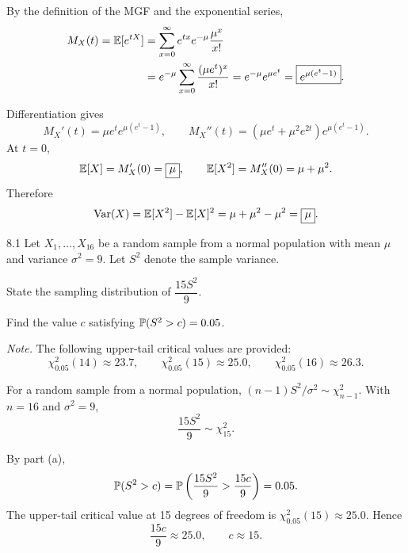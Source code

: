 \documentclass[11pt,oneside]{article}
\begin{document}
\begin{solution}
\begin{problemsubparts}
\item By the definition of the MGF and the exponential series,
\[
\begin{aligned}
M_X(t)=\mathbb{E}[e^{tX}]
&=\sum_{x=0}^{\infty}e^{tx}e^{-\mu}\frac{\mu^x}{x!}\\
&=e^{-\mu}\sum_{x=0}^{\infty}\frac{(\mu e^t)^x}{x!}
=e^{-\mu}e^{\mu e^t}
=\boxed{e^{\mu(e^t-1)}}.
\end{aligned}
\]
\item Differentiation gives
\[
M_X'(t)=\mu e^t e^{\mu(e^t-1)},\qquad
M_X''(t)=(\mu e^t+\mu^2e^{2t})e^{\mu(e^t-1)}.
\]
At $t=0$,
\[
\mathbb{E}[X]=M_X'(0)=\boxed{\mu},\qquad
\mathbb{E}[X^2]=M_X''(0)=\mu+\mu^2.
\]
Therefore
\[
\operatorname{Var}(X)=\mathbb{E}[X^2]-\mathbb{E}[X]^2
=\mu+\mu^2-\mu^2=\boxed{\mu}.
\]
\end{problemsubparts}
\end{solution}

\begin{problem}{8.1}
Let $X_1,\ldots,X_{16}$ be a random sample from a normal population with mean $\mu$ and variance $\sigma^2=9$. Let $S^2$ denote the sample variance.
\begin{problemsubparts}
\item State the sampling distribution of $\dfrac{15S^2}{9}$.
\item Find the value $c$ satisfying $\mathbb{P}(S^2>c)=0.05$.
\end{problemsubparts}
\textit{Note.} The following upper-tail critical values are provided:
\[
\chi^2_{0.05}(14)\approx23.7,\qquad
\chi^2_{0.05}(15)\approx25.0,\qquad
\chi^2_{0.05}(16)\approx26.3.
\]
\end{problem}

\begin{solution}
\begin{problemsubparts}
\item For a random sample from a normal population, $(n-1)S^2/\sigma^2\sim\chi^2_{n-1}$. With $n=16$ and $\sigma^2=9$,
\[
\boxed{\frac{15S^2}{9}\sim\chi^2_{15}}.
\]
\item By part (a),
\[
\mathbb{P}(S^2>c)=\mathbb{P}\left(\frac{15S^2}{9}>\frac{15c}{9}\right)=0.05.
\]
The upper-tail critical value at 15 degrees of freedom is $\chi^2_{0.05}(15)\approx25.0$. Hence
\[
\frac{15c}{9}\approx25.0,\qquad \boxed{c\approx15}.
\]
\end{problemsubparts}
\end{solution}
\end{document}
